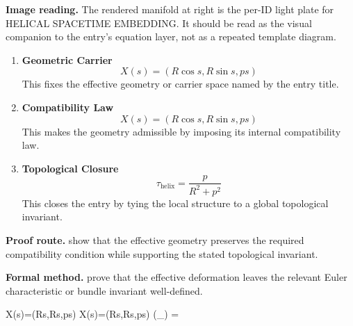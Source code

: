 \begin{samepage}
\noindent\begin{minipage}[t]{0.45\linewidth}
\vspace{0pt}
\raggedright
\scriptsize\textbf{Image reading.} The rendered manifold at right is the per-ID light plate for HELICAL SPACETIME EMBEDDING. It should be read as the visual companion to the entry's equation layer, not as a repeated template diagram.\par
\end{minipage}\hfill
\begin{minipage}[t]{0.53\linewidth}
\vspace*{-0.10in}
\raggedright
{}
\end{minipage}
\end{samepage}

\clearpage


\begin{enumerate}[leftmargin=1.6em,itemsep=9pt,topsep=6pt]
\item \textbf{Geometric Carrier}
\[
X(s)=(R\cos s,R\sin s,ps)
\]
This fixes the effective geometry or carrier space named by the entry title.

\item \textbf{Compatibility Law}
\[
X(s)=(R\cos s,R\sin s,ps)
\]
This makes the geometry admissible by imposing its internal compatibility law.

\item \textbf{Topological Closure}
\[
\tau_{\mathrm{helix}}=\frac{p}{R^2+p^2}
\]
This closes the entry by tying the local structure to a global topological invariant.
\end{enumerate}

\textbf{Proof route.} show that the effective geometry preserves the required compatibility condition while supporting the stated topological invariant.

\textbf{Formal method.} prove that the effective deformation leaves the relevant Euler characteristic or bundle invariant well-defined.

\medskip
{}

\begin{tzpsnapshot}
\end{tzpsnapshot}

\tzpequationlinks
  {X(s)=(R\cos s,R\sin s,ps)}
  {X(s)=(R\cos s,R\sin s,ps)}
  {\chi(_{}) = \cdots}
